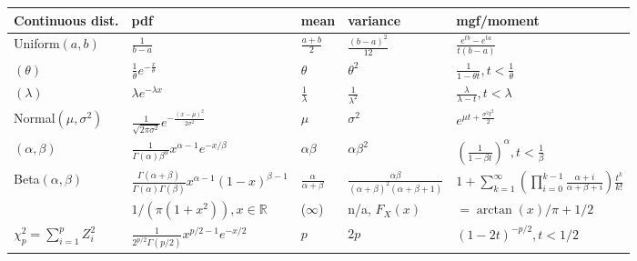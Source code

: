 \documentclass[titlepage, a4paper, landscape]{article}
\begin{document}
\begin{multicols}{2}
		\begin{tabular}{lllll}
			\toprule
			Continuous dist. & pdf & mean & variance & mgf/moment \\
			\midrule
			{Uniform}$(a, b)$ & $\displaystyle\frac{1}{b-a}$ & $\displaystyle\frac{a+b}{2}$ & $\displaystyle\frac{(b-a)^2}{12}$ & $\displaystyle\frac{e^{tb}-e^{ta}}{t(b-a)}$ \\
			\rowcolor{gray!15}{Exponential}$(\theta)$ & $\displaystyle\frac{1}{\theta}e^{-\frac{x}{\theta}}$ & $\theta$ & $\theta^2$ & $\displaystyle\frac{1}{1-\theta t}, t < \frac{1}{\theta}$ \\
			\rowcolor{gray!15}{Exponential}$(\lambda)$ & $\lambda e^{-\lambda x}$ & $\displaystyle\frac{1}{\lambda}$ & $\displaystyle\frac{1}{\lambda^2}$ & $\displaystyle\frac{\lambda}{\lambda-t}, t < \lambda$ \\
			{Normal}$(\mu, \sigma^2)$ & \large{$\displaystyle\frac{1}{\sqrt{2\pi\sigma^2}}e^{-\frac{(x-\mu)^2}{2\sigma^2}}$} & $\mu$ & $\sigma^2$ & $e^{\mu t + \frac{\sigma^2 t^2}{2}}$ \\
			\rowcolor{gray!15}{Gamma}$(\alpha, \beta)$ & $\displaystyle\frac{1}{\Gamma(\alpha)\beta^\alpha}x^{\alpha-1}e^{-x / \beta}$ & $\alpha\beta$ & $\alpha\beta^2$ & $\displaystyle\left(\frac{1}{1-\beta t}\right)^\alpha, t < \frac{1}{\beta}$ \\
			{Beta}$(\alpha, \beta)$ & $\displaystyle \frac{\Gamma(\alpha+\beta)}{\Gamma(\alpha)\Gamma(\beta)}x^{\alpha-1}(1-x)^{\beta-1}$ & $\displaystyle \frac{\alpha}{\alpha+\beta}$ & $ \frac{\alpha\beta}{(\alpha+\beta)^2(\alpha+\beta+1)}$ & $1 + \sum_{k=1}^{\infty} \left(\prod_{i=0}^{k-1} \frac{\alpha+i}{\alpha+\beta+i}\right) \frac{t^k}{k!}$ \\
			\rowcolor{gray!15}{Cauchy} & $1 / \left( \pi (1 + x ^ 2)\right), x \in \mathbb R $ & ($\infty$) & n/a, \;\; $F_X(x)$ & $= \arctan(x)/\pi + 1/2$\\
			{$\chi^2_p = \sum_{i = 1}^p Z_i^2$} & $\displaystyle \frac{1}{2^{p/2}\Gamma(p/2)}x^{p/2-1}e^{-x/2}$ & $p$ & $2p$ & $(1-2t)^{-p/2}, t < 1/2$ \\
			\bottomrule
		\end{tabular}
	\end{multicols}
\end{document}
